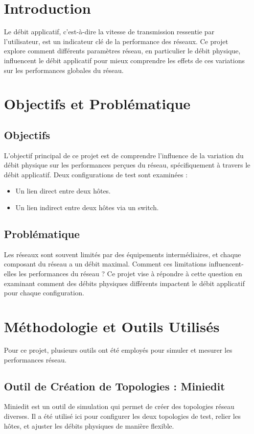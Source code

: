 \section{Introduction}
 Le débit applicatif, c’est-à-dire la vitesse de transmission ressentie par l’utilisateur, est un indicateur clé de la performance des réseaux. Ce projet explore comment différents paramètres réseau, en particulier le débit physique, influencent le débit applicatif pour mieux comprendre les effets de ces variations sur les performances globales du réseau.

\section{Objectifs et Problématique}

\subsection{Objectifs}
L’objectif principal de ce projet est de comprendre l’influence de la variation du débit physique sur les performances perçues du réseau, spécifiquement à travers le débit applicatif. Deux configurations de test sont examinées :
\begin{itemize}
    \item Un lien direct entre deux hôtes.
    \item Un lien indirect entre deux hôtes via un switch.
\end{itemize}

\subsection{Problématique}
Les réseaux sont souvent limités par des équipements intermédiaires, et chaque composant du réseau a un débit maximal. Comment ces limitations influencent-elles les performances du réseau ? Ce projet vise à répondre à cette question en examinant comment des débits physiques différents impactent le débit applicatif pour chaque configuration.

\section{Méthodologie et Outils Utilisés}
Pour ce projet, plusieurs outils ont été employés pour simuler et mesurer les performances réseau.

\subsection{Outil de Création de Topologies : Miniedit}
Miniedit est un outil de simulation qui permet de créer des topologies réseau diverses. Il a été utilisé ici pour configurer les deux topologies de test, relier les hôtes, et ajuster les débits physiques de manière flexible.

